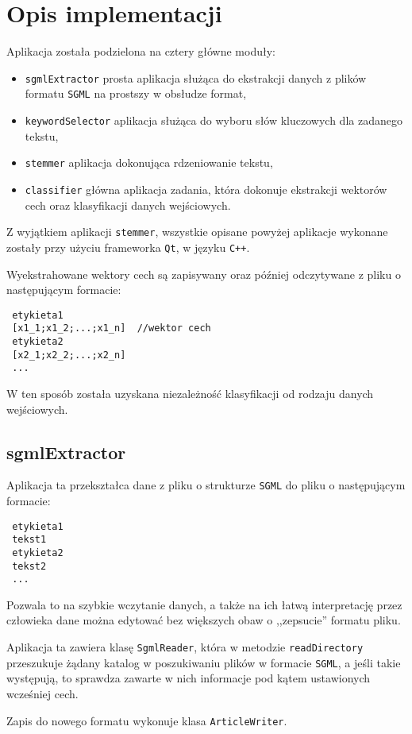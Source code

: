 \documentclass{classrep}
\begin{document}
\section{Opis implementacji}
{\color{blue} 
Aplikacja została podzielona na cztery główne moduły:
\begin{itemize}
 \item \verb|sgmlExtractor| \ppauza prosta aplikacja służąca do ekstrakcji danych z plików formatu \verb|SGML| na prostszy w obsłudze format,
 \item \verb|keywordSelector| \ppauza aplikacja służąca do wyboru słów kluczowych dla zadanego tekstu,
 \item \verb|stemmer| \ppauza aplikacja dokonująca rdzeniowanie tekstu,
 \item \verb|classifier| \ppauza główna aplikacja zadania, która dokonuje ekstrakcji wektorów cech oraz klasyfikacji danych wejściowych.
\end{itemize}
Z wyjątkiem aplikacji \verb|stemmer|, wszystkie opisane powyżej aplikacje wykonane zostały przy użyciu frameworka \verb|Qt|, w języku \verb|C++|.

Wyekstrahowane wektory cech są zapisywany oraz później odczytywane z pliku o następującym formacie:
\begin{verbatim}
 etykieta1
 [x1_1;x1_2;...;x1_n]  //wektor cech
 etykieta2
 [x2_1;x2_2;...;x2_n]
 ...
\end{verbatim}
W ten sposób została uzyskana niezależność klasyfikacji od rodzaju danych wejściowych.


\subsection{sgmlExtractor}
Aplikacja ta przekształca dane z pliku o strukturze \verb|SGML| do pliku o następującym formacie:
\begin{verbatim}
 etykieta1
 tekst1
 etykieta2
 tekst2
 ...
\end{verbatim}
Pozwala to na szybkie wczytanie danych, a także na ich łatwą interpretację przez człowieka \ppauza dane można edytować bez większych obaw o ,,zepsucie'' formatu pliku.

Aplikacja ta zawiera klasę \verb|SgmlReader|, która w metodzie \verb|readDirectory| przeszukuje żądany katalog w poszukiwaniu plików w formacie \verb|SGML|, a jeśli takie występują, to sprawdza zawarte w nich informacje pod kątem ustawionych wcześniej cech.

Zapis do nowego formatu wykonuje klasa \verb|ArticleWriter|.

}
\end{document}
